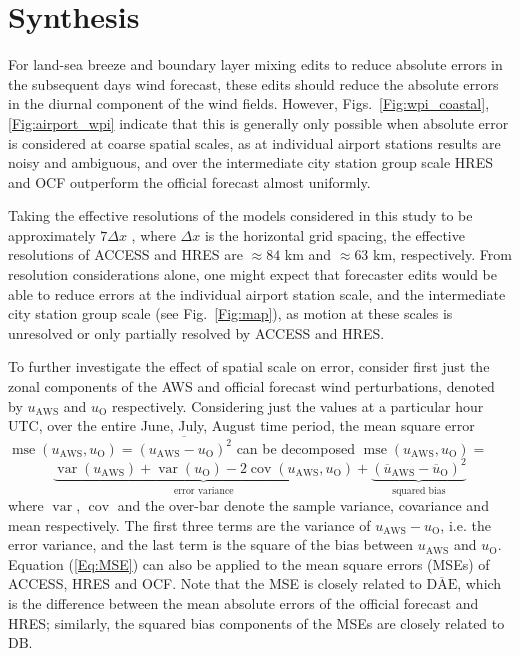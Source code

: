 \documentclass[twocol]{ametsoc}
\DeclareMathOperator{\mse}{mse}
\DeclareMathOperator{\cov}{cov}
\DeclareMathOperator{\var}{var}
\begin{document}
\section{Synthesis}
\label{Sec:Discussion}
For land-sea breeze and boundary layer mixing edits to reduce absolute errors in the subsequent days wind forecast, these edits should reduce the absolute errors in the diurnal component of the wind fields. However, Figs.~\ref{Fig:wpi_coastal},\ref{Fig:airport_wpi} indicate that this is generally only possible when absolute error is considered at coarse spatial scales, as at individual airport stations results are noisy and ambiguous, and over the intermediate city station group scale HRES and OCF outperform the official forecast almost uniformly.

Taking the effective resolutions of the models considered in this study to be approximately $7\Delta x$ \citep[e.g.][]{skamarock04, abdalla13}, where $\Delta x$ is the horizontal grid spacing, the effective resolutions of ACCESS and HRES are $\approx 84$ km and $\approx 63$ km, respectively. From resolution considerations alone, one might expect that forecaster edits would be able to reduce errors at the individual airport station scale, and the intermediate city station group scale (see Fig.~\ref{Fig:map}), as motion at these scales is unresolved or only partially resolved by ACCESS and HRES.

To further investigate the effect of spatial scale on error, consider first just the zonal components of the AWS and official forecast wind perturbations, denoted by $u_\text{AWS}$ and $u_\text{O}$ respectively. Considering just the values at a particular hour UTC, over the entire June, July, August time period, the mean square error $\mse\left(u_\text{AWS}, u_\text{O}\right) = \overline{\left(u_\text{AWS} - u_\text{O}\right)^2}$ can be decomposed $\mse\left(u_\text{AWS}, u_\text{O}\right)=$ 
\begin{equation}
\underbrace{\var\left(u_\text{AWS}\right) + \var\left(u_\text{O}\right) - 2\cov\left(u_\text{AWS}, u_\text{O}\right)}_\text{error variance} + \underbrace{\left(\overline{u}_\text{AWS} - \overline{u}_\text{O}\right)^2}_{\text{squared bias}} \label{Eq:MSE}
\end{equation}
where $\var$, $\cov$ and the over-bar denote the sample variance, covariance and mean respectively. The first three terms are the variance of $u_\text{AWS} - u_\text{O}$, i.e. the error variance, and the last term is the square of the bias between $u_\text{AWS}$ and $u_\text{O}$. Equation (\ref{Eq:MSE}) can also be applied to the mean square errors (MSEs) of ACCESS, HRES and OCF. Note that the MSE is closely related to $\overline{\text{DAE}}$, which is the difference between the mean absolute errors of the official forecast and HRES; similarly, the squared bias components of the MSEs are closely related to $\text{DB}$. 
\end{document}
